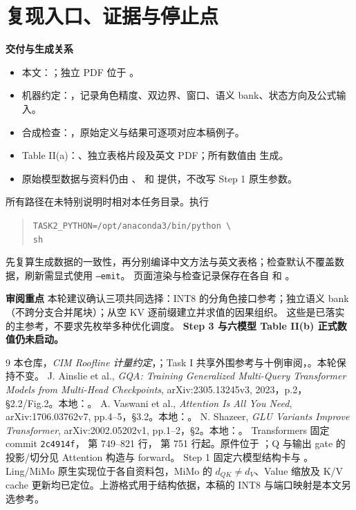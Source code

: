 \documentclass[11pt,a4paper,fontset=fandol]{ctexart}
\newcommand{\para}[1]{\par\smallskip\noindent\textbf{#1}\quad}
\begin{document}
\clearpage
\section{复现入口、证据与停止点}
\para{交付与生成关系}
\begin{itemize}
\item 本文：；独立 PDF 位于 。
\item 机器约定：，记录角色精度、双边界、窗口、语义 bank、状态方向及公式输入。
\item 合成检查：，原始定义与结果可逐项对应本稿例子。
\item Table II(a)：、独立表格片段及英文 PDF；所有数值由  生成。
\item 原始模型数据与资料仍由 、 和  提供，不改写 Step 1 原生参数。
\end{itemize}
所有路径在未特别说明时相对本任务目录。执行
\begin{quote}\small
\texttt{TASK2\_PYTHON=/opt/anaconda3/bin/python \textbackslash}\\
\texttt{sh }
\end{quote}
先复算生成数据的一致性，再分别编译中文方法与英文表格；检查默认不覆盖数据，刷新需显式使用 \texttt{--emit}。
页面渲染与检查记录保存在各自  和 。

\para{审阅重点}
本轮建议确认三项共同选择：INT8 的分角色接口参考；独立语义 bank（不跨分支合并尾块）；从空 KV 逐前缀建立并求值的因果组织。
这些是已落实的主参考，不要求先枚举多种优化调度。
\textbf{Step 3 与六模型 Table II(b) 正式数值仍未启动。}

\begin{thebibliography}{9}\small
{} 本仓库，\emph{CIM Roofline 计量约定}，；Task I 共享外围参考与十例审阅，。本轮保持不变。
 J. Ainslie et al., \emph{GQA: Training Generalized Multi-Query Transformer Models from Multi-Head Checkpoints}, arXiv:2305.13245v3, 2023，p.2，§2.2/Fig.2。本地：。
 A. Vaswani et al., \emph{Attention Is All You Need}, arXiv:1706.03762v7, pp.4--5，§3.2。本地：。
 N. Shazeer, \emph{GLU Variants Improve Transformer}, arXiv:2002.05202v1, pp.1--2，§2。本地：。
 Transformers 固定 commit \texttt{2c4914f}， 第 749--821 行， 第 751 行起。原件位于 ；Q 与输出 gate 的投影/切分见 Attention 构造与 forward。
 Step 1 固定六模型结构卡与 。Ling/MiMo 原生实现位于各自资料包，MiMo 的 $d_{QK}\ne d_V$、Value 缩放及 K/V cache 更新均已定位。上游格式用于结构依据，本稿的 INT8 与端口映射是本文另选参考。
\end{thebibliography}
\end{document}
